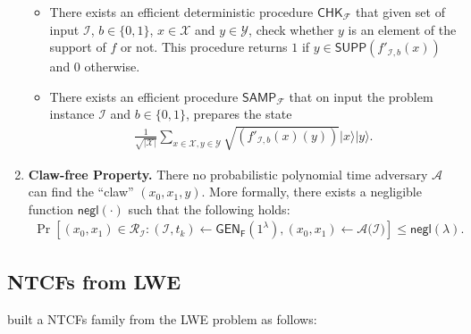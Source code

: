 \documentclass[cryptography,review,submit,pdftex,moreauthors,amsmath,amssymb,aps,strict]{Definitions/mdpi}
\begin{document}
\begin{Definition}
\begin{enumerate}
\begin{itemize}
        \item There exists an efficient deterministic procedure $\mathsf{CHK}_{\mathcal{F}}$ that given set of input $\mathcal{I}$, $b\in\{0,1\}$, $x\in \mathcal{X}$ and $y\in \mathcal{Y}$, check whether $y$ is an element of the support of $f$ or not. This procedure returns $1$ if $y\in \mathsf{SUPP}(f'_{\mathcal{I},b}(x))$ and $0$ otherwise. 
        \item 
        There exists an efficient procedure $\mathsf{SAMP}_{\mathcal{F}}$ that on input the problem instance $\mathcal{I}$ and $b\in\{0,1\}$, prepares the state
        \begin{align}
            \displaystyle{\frac{1}{\sqrt{|\mathcal{X}|}}}\sum_{x\in\mathcal{X},y\in\mathcal{Y}}\sqrt{(f'_{\mathcal{I},b}(x)(y))}|x\rangle|y\rangle.
        \end{align}
    \end{itemize}
    \item \textbf{Claw-free Property.} There no probabilistic polynomial time adversary $\mathcal{A}$ can find the ``claw'' $(x_0,x_1,y)$. More formally, there exists a negligible function $\mathsf{negl}(\cdot)$ such that the following holds:
    \begin{align}
        \Pr[(x_0,x_1)\in\mathcal{R}_{\mathcal{I}}:(\mathcal{I},t_k)\gets \mathsf{GEN}_{\mathsf{F}}(1^{\lambda}),(x_0,x_1)\gets \mathcal{A}(\mathcal{I)}]\leq \mathsf{negl}(\lambda).
    \end{align}
\end{enumerate}
\end{Definition}
\subsection[\appendixname~\thesubsection]{NTCFs from LWE}
\cite{Brakerski18_Interactiveproofofquantumness} built a NTCFs family from the LWE problem as follows:
\end{document}

